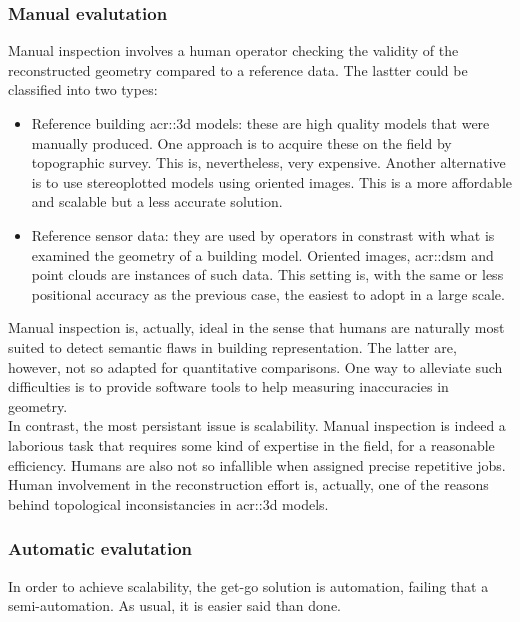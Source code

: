         \subsubsection{Manual evalutation}
            Manual inspection involves a human operator checking the validity of the reconstructed geometry compared to a reference data.
            The lastter could be classified into two types:
            \begin{itemize}
                \item Reference building \gls{acr::3d} models: these are high quality models that were manually produced.
                    One approach is to acquire these on the field by topographic survey.
                    This is, nevertheless, very expensive.
                    Another alternative is to use stereoplotted models using oriented images.
                    This is a more affordable and scalable but a less accurate solution.
                \item Reference sensor data: they are used by operators in constrast with what is examined the geometry of a building model.
                    Oriented images, \gls{acr::dsm} and point clouds are instances of such data.
                    This setting is, with the same or less positional accuracy as the previous case, the easiest to adopt in a large scale.
            \end{itemize}

            Manual inspection is, actually, ideal in the sense that humans are naturally most suited to detect semantic flaws in building representation.
            The latter are, however, not so adapted for quantitative comparisons.
            One way to alleviate such difficulties is to provide software tools to help measuring inaccuracies in geometry\addref.\\

            In contrast, the most persistant issue is scalability.
            Manual inspection is indeed a laborious task that requires some kind of expertise in the field, for a reasonable efficiency.
            Humans are also not so infallible when assigned precise repetitive jobs.
            Human involvement in the reconstruction effort is, actually, one of the reasons behind topological inconsistancies in \gls{acr::3d} models.

        \subsubsection{Automatic evalutation}
            In order to achieve scalability, the get-go solution is automation, failing that a semi-automation.
            As usual, it is easier said than done.\\

